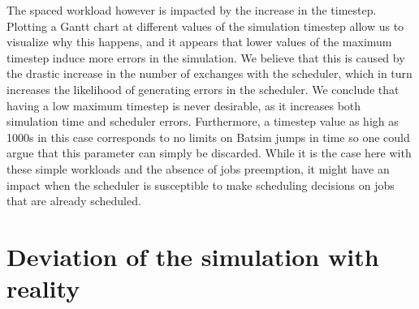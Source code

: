The spaced workload however is impacted by the increase in the timestep.
Plotting a Gantt chart at different values of the simulation timestep allow us
to visualize why this happens, and it appears that lower values of the maximum
timestep induce more errors in the simulation. We believe that this is caused
by the drastic increase in the number of exchanges with the scheduler, which in
turn increases the likelihood of generating errors in the scheduler. We
conclude that having a low maximum timestep is never desirable, as it increases
both simulation time and scheduler errors. Furthermore, a timestep value as
high as 1000s in this case corresponds to no limits on Batsim jumps in time so
one could argue that this parameter can simply be discarded. While it is the
case here with these simple workloads and the absence of jobs preemption, it
might have an impact when the scheduler is susceptible to make scheduling
decisions on jobs that are already scheduled.

%
%
%
%
%
%

\section{Deviation of the simulation with reality}

